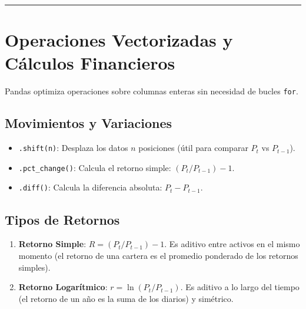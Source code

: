 \documentclass[
  spanish,
  letterpaper,
  DIV=11,
  numbers=noendperiod]{scrreprt}
\providecommand{\tightlist}{%
  \setlength{\itemsep}{0pt}\setlength{\parskip}{0pt}}
\begin{document}
\begin{center}\rule{0.5\linewidth}{0.5pt}\end{center}

\section{Operaciones Vectorizadas y Cálculos
Financieros}\label{operaciones-vectorizadas-y-cuxe1lculos-financieros}

Pandas optimiza operaciones sobre columnas enteras sin necesidad de
bucles \texttt{for}.

\subsection{Movimientos y Variaciones}\label{movimientos-y-variaciones}

\begin{itemize}
\tightlist
\item
  \texttt{.shift(n)}: Desplaza los datos \(n\) posiciones (útil para
  comparar \(P_t\) vs \(P_{t-1}\)).
\item
  \texttt{.pct\_change()}: Calcula el retorno simple:
  \((P_t / P_{t-1}) - 1\).
\item
  \texttt{.diff()}: Calcula la diferencia absoluta: \(P_t - P_{t-1}\).
\end{itemize}

\subsection{Tipos de Retornos}\label{tipos-de-retornos}

\begin{enumerate}
\def\labelenumi{\arabic{enumi}.}
\tightlist
\item
  \textbf{Retorno Simple}: \(R = (P_t / P_{t-1}) - 1\). Es aditivo entre
  activos en el mismo momento (el retorno de una cartera es el promedio
  ponderado de los retornos simples).
\item
  \textbf{Retorno Logarítmico}: \(r = \ln(P_t / P_{t-1})\). Es aditivo a
  lo largo del tiempo (el retorno de un año es la suma de los diarios) y
  simétrico.
\end{enumerate}
\end{document}
